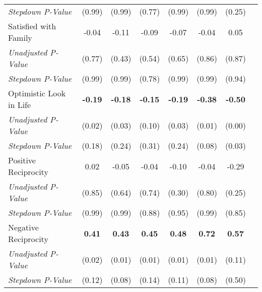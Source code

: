 \begin{tabular}{l c c c c c c c}
\quad \textit{Stepdown P-Value} & (0.99) & (0.99) & (0.77) & (0.99) & (0.99) & (0.25) \\
Satisfied with Family & -0.04 & -0.11 & -0.09 & -0.07 & -0.04 & 0.05 \\
\quad \textit{Unadjusted P-Value} & (0.77) & (0.43) & (0.54) & (0.65) & (0.86) & (0.87) \\
\quad \textit{Stepdown P-Value} & (0.99) & (0.99) & (0.78) & (0.99) & (0.99) & (0.94) \\
Optimistic Look in Life & \textbf{ -0.19 } & \textbf{ -0.18 } & \textbf{ -0.15 } & \textbf{ -0.19 } & \textbf{ -0.38 } & \textbf{ -0.50 } \\
\quad \textit{Unadjusted P-Value} & (0.02) & (0.03) & (0.10) & (0.03) & (0.01) & (0.00) \\
\quad \textit{Stepdown P-Value} & (0.18) & (0.24) & (0.31) & (0.24) & (0.08) & (0.03) \\
Positive Reciprocity & 0.02 & -0.05 & -0.04 & -0.10 & -0.04 & -0.29 \\
\quad \textit{Unadjusted P-Value} & (0.85) & (0.64) & (0.74) & (0.30) & (0.80) & (0.25) \\
\quad \textit{Stepdown P-Value} & (0.99) & (0.99) & (0.88) & (0.95) & (0.99) & (0.85) \\
Negative Reciprocity & \textbf{ 0.41 } & \textbf{ 0.43 } & \textbf{ 0.45 } & \textbf{ 0.48 } & \textbf{ 0.72 } & \textbf{ 0.57 } \\
\quad \textit{Unadjusted P-Value} & (0.02) & (0.01) & (0.01) & (0.01) & (0.01) & (0.11) \\
\quad \textit{Stepdown P-Value} & (0.12) & (0.08) & (0.14) & (0.11) & (0.08) & (0.50) \\
\bottomrule
\end{tabular}
